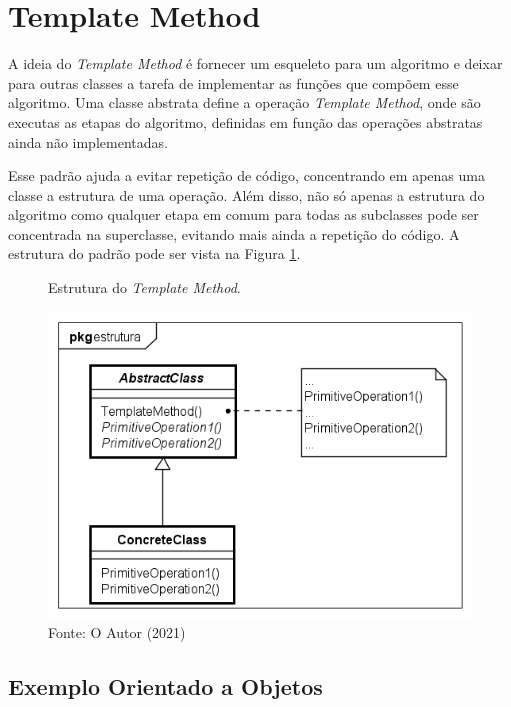 \section{Template Method}

A ideia do \textit{Template Method} é fornecer um esqueleto para um algoritmo 
e deixar para outras classes a tarefa de implementar as funções que 
compõem esse algoritmo. Uma classe abstrata define a operação 
\textit{Template Method}, onde são executas as etapas do 
algoritmo, definidas em função 
das operações abstratas ainda não implementadas.\cite{gamma:1995}

Esse padrão ajuda a evitar repetição de código, concentrando 
em apenas uma classe a estrutura de uma operação. Além disso, 
não só apenas a estrutura do algoritmo como qualquer etapa em 
comum para todas as subclasses pode ser concentrada na superclasse, 
evitando mais ainda a repetição do código. A estrutura do padrão 
pode ser vista na Figura \ref{tpmethod_struct}.

\begin{figure}[htb]
	\caption{\label{tpmethod_struct}Estrutura do \textit{Template Method}.}
	\begin{center}
	    \includegraphics[scale=0.5]{5_padroes-contexto-funcional/5.3_comportamentais/5.3.10_template-method/templatemethod_estrutura.png}
	\end{center}
  \caption*{Fonte: O Autor (2021)}
\end{figure}

\subsection*{Exemplo Orientado a Objetos}


